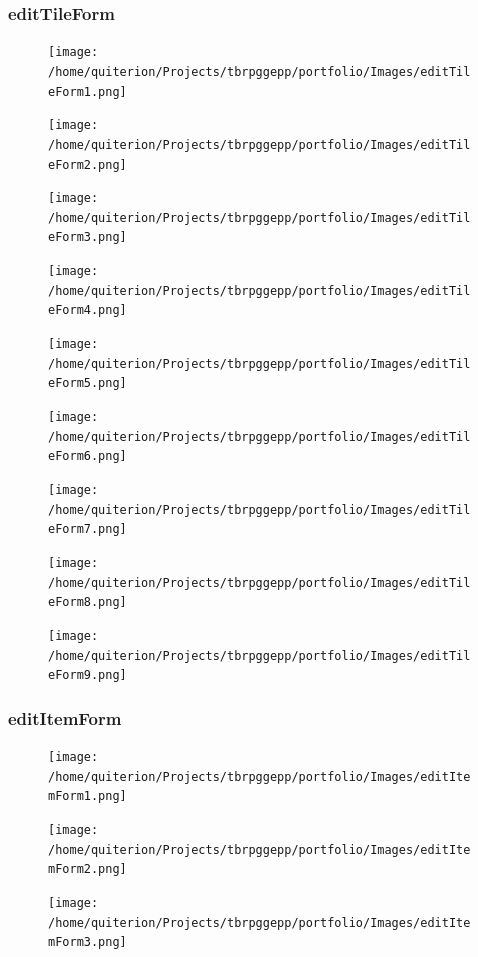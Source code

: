 \documentclass{article} \usepackage[margin=1in,headheight=57pt,headsep=0.1in]{geometry}
\begin{document}
\subsubsection{editTileForm}
\begin{figure}[H]
	\centering
	\texttt{[image: /home/quiterion/Projects/tbrpggepp/portfolio/Images/editTileForm1.png]}
\end{figure}
\begin{figure}[H]
	\centering
	\texttt{[image: /home/quiterion/Projects/tbrpggepp/portfolio/Images/editTileForm2.png]}
\end{figure}
\begin{figure}[H]
	\centering
	\texttt{[image: /home/quiterion/Projects/tbrpggepp/portfolio/Images/editTileForm3.png]}
\end{figure}
\begin{figure}[H]
	\centering
	\texttt{[image: /home/quiterion/Projects/tbrpggepp/portfolio/Images/editTileForm4.png]}
\end{figure}
\begin{figure}[H]
	\centering
	\texttt{[image: /home/quiterion/Projects/tbrpggepp/portfolio/Images/editTileForm5.png]}
\end{figure}
\begin{figure}[H]
	\centering
	\texttt{[image: /home/quiterion/Projects/tbrpggepp/portfolio/Images/editTileForm6.png]}
\end{figure}
\begin{figure}[H]
	\centering
	\texttt{[image: /home/quiterion/Projects/tbrpggepp/portfolio/Images/editTileForm7.png]}
\end{figure}
\begin{figure}[H]
	\centering
	\texttt{[image: /home/quiterion/Projects/tbrpggepp/portfolio/Images/editTileForm8.png]}
\end{figure}
\begin{figure}[H]
	\centering
	\texttt{[image: /home/quiterion/Projects/tbrpggepp/portfolio/Images/editTileForm9.png]}
\end{figure}

\subsubsection{editItemForm}
\begin{figure}[H]
	\centering
	\texttt{[image: /home/quiterion/Projects/tbrpggepp/portfolio/Images/editItemForm1.png]}
\end{figure}
\begin{figure}[H]
	\centering
	\texttt{[image: /home/quiterion/Projects/tbrpggepp/portfolio/Images/editItemForm2.png]}
\end{figure}
\begin{figure}[H]
	\centering
	\texttt{[image: /home/quiterion/Projects/tbrpggepp/portfolio/Images/editItemForm3.png]}
\end{figure}
\end{document}
